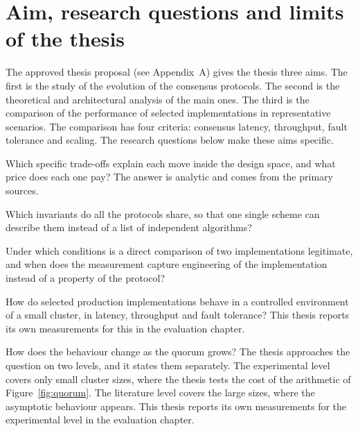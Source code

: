 \section{Aim, research questions and limits of the thesis}
\label{sec:aims}

The approved thesis proposal (see Appendix~A) gives the thesis three
aims. The first is the study of the evolution of the consensus
protocols. The second is the theoretical and architectural analysis of
the main ones. The third is the comparison of the performance of selected
implementations in representative scenarios. The comparison has four
criteria: consensus latency, throughput, fault tolerance and scaling. The
research questions below make these aims specific.

\begin{description}[leftmargin=2.1em,style=nextline,font=\normalfont\bfseries]
  \item[RQ1 --- Evolution.] Which specific trade-offs explain each move
  inside the design space, and what price does each one pay? The answer
  is analytic and comes from the primary sources.
  \item[RQ2 --- Common structure.] Which invariants do all the protocols
  share, so that one single scheme can describe them instead of a list of
  independent algorithms?
  \item[RQ3 --- Comparability.] Under which conditions is a direct
  comparison of two implementations legitimate, and when does the
  measurement capture engineering of the implementation instead of a
  property of the protocol?
  \item[RQ4 --- Empirical behaviour.] How do selected production
  implementations behave in a controlled environment of a small cluster,
  in latency, throughput and fault tolerance? This thesis reports its own
  measurements for this in the evaluation chapter.
  \item[RQ5 --- Scaling.] How does the behaviour change as the quorum
  grows? The thesis approaches the question on two levels, and it states
  them separately. The experimental level covers only small cluster
  sizes, where the thesis tests the cost of the arithmetic of
  Figure~\ref{fig:quorum}. The literature level covers the large sizes,
  where the asymptotic behaviour appears. This thesis reports its own
  measurements for the experimental level in the evaluation chapter.
\end{description}

